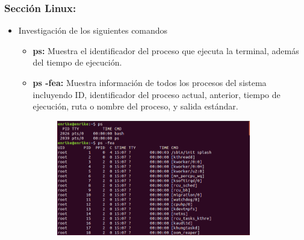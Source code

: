 \documentclass[12pt]{article}
\begin{document}
        \subsubsection{Sección Linux:}
        \begin{itemize}
        \item[\Checkmark] Investigación de los siguientes comandos
        \begin{itemize}
            \item \textbf{ps: } Muestra el identificador del proceso que ejecuta la terminal, además del tiempo de ejecución.
            \item \textbf{ps -fea: } Muestra información de todos los procesos del sistema incluyendo ID, identificador del proceso actual, anterior, tiempo de ejecución, ruta o nombre del proceso, y salida estándar.    
            
            \begin{figure}[h!]
                \centering
                \includegraphics[width=0.85\textwidth]{Practica4/Images/Linux/ps.png}
            \end{figure}
                                      

\end{itemize}
\end{itemize}
\end{document}
